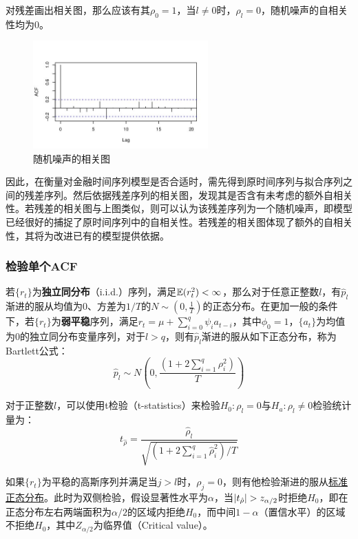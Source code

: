 \documentclass[11pt]{article}
\begin{document}
对残差画出相关图，那么应该有其$\rho_0=1$，当$l\neq 0$时，$\rho_l=0$，随机噪声的自相关性均为0。

\begin{figure}[H]
    \centering
    \includegraphics[width=0.6\textwidth]{fig/white-noise-acf.jpg}
    \caption{随机噪声的相关图}
    \label{fig:white-noise-acf}
\end{figure}

因此，在衡量对金融时间序列模型是否合适时，需先得到原时间序列与拟合序列之间的残差序列。然后依据残差序列的相关图，发现其是否含有未考虑的额外自相关性。若残差的相关图与上图类似，则可以认为该残差序列为一个随机噪声，即模型已经很好的捕捉了原时间序列中的自相关性。若残差的相关图体现了额外的自相关性，其将为改进已有的模型提供依据。

\subsubsection*{检验单个ACF}

若$\{r_t\}$为\textbf{独立同分布}（i.i.d.）序列，满足$\mathbb{E}(r_t^2)<\infty$，那么对于任意正整数$l$，有$\hat{p}_l$渐进的服从均值为$0$、方差为$1/T$的$N\sim(0,\frac{1}{T})$的正态分布。在更加一般的条件下，若$\{r_t\}$为\textbf{弱平稳}序列，满足$r_t = \mu + \sum_{i=0}^{q}\psi_i a_{t-i}$，其中$\phi_0=1$，$\{a_t\}$为均值为0的独立同分布变量序列，对于$l>q$，则有$\hat{p}_l$渐进的服从如下正态分布，称为Bartlett公式：
\begin{equation*}
    \hat{p}_l \sim N\left(0,\frac{\left( 1+2\sum_{i=1}^{q}\rho_i^2 \right)}{T} \right)    
\end{equation*}

对于正整数$l$，可以使用t检验（t-statistics）来检验$H_0: \rho_l =0$与$H_a: \rho_l \neq 0$检验统计量为：
\begin{equation*}
    t_{\hat{\rho}} = \frac{\hat{\rho}_l}{\sqrt{\left( 1+2\sum_{i=1}^{q}\hat{\rho}_i^2 \right)/T}}
\end{equation*}

如果$\{r_t\}$为平稳的高斯序列并满足当$j>l$时，$\rho_j=0$，则有他检验渐进的服从\uline{标准正态分布}。此时为双侧检验，假设显著性水平为$\alpha$，当$\left\lvert t_{\hat{\rho}}\right\rvert>z_{\alpha/2}$时拒绝$H_0$，即在正态分布左右两端面积为$\alpha/2$的区域内拒绝$H_0$，而中间$1-\alpha$（置信水平）的区域不拒绝$H_0$，其中$Z_{\alpha/2}$为临界值（Critical value）。
\end{document}
